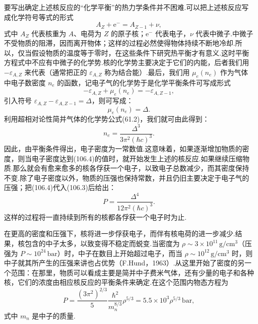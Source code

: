 要写出确定上述核反应的“化学平衡”的热力学条件并不困难.可以把上述核反应写成化学符号等式的形式
\begin{equation*}
  A_Z+\mathrm{e}^-=A_{Z-1}+\nu,
\end{equation*}
式中 $A_Z$ 代表核重为 $A$、电荷为 $Z$ 的原子核；$\mathrm{e}^-$ 代表电子，$\nu$ 代表中微子.中微子不受物质的阻滞，因而离开物体；这样的过程必然使得物体持续不断地冷却.所以，仅当假设物质的温度等于零时，在这些条件下研究热平衡才有意义.这时平衡方程式中不应有中微子的化学势.核的化学势主要决定于它们的内能，后者我们用 $-\varepsilon_{A,Z}$ 来代表（通常把正的 $\varepsilon_{A,Z}$ 称为结合能）.最后，我们用 $\mu_e(n_e)$ 作为气体中电子数密度 $n_e$ 的函数，记电子气的化学势于是化学平衡条件可写成形式
\begin{equation*}
  -\varepsilon_{A,Z}+\mu_e(n_e)=-\varepsilon_{A,Z-1},
\end{equation*}
引入符号 $\varepsilon_{A,Z}-\varepsilon_{A,Z-1}=\Delta$，则可写成：
\begin{equation*}
  \mu_e(n_e)=\Delta.
\end{equation*}
利用超相对论性简并气体的化学势公式(61.2)，我们就可由此得到：
\begin{equation}
  n_e=\frac{\Delta^3}{3\pi^2(\hbar c)^3}.
\end{equation}
因此，由平衡条件得出，电子密度为一常数值.这意味着，如果逐渐增加物质的密度，则当电子密度达到(106.4)的值时，就开始发生上述的核反应.如果继续压缩物质.那么就会有愈来愈多的核各俘获一个电子，以致电子总数减少，而其密度保持不变.除了电子密度以外，物质的压强也保持常数，并且仍旧主要决定于电子气的压强；把(106.4)代入(106.3)后给出：
\begin{equation}
  P=\frac{\Delta^4}{12\pi^2(\hbar c)^3}.
\end{equation}
这样的过程将一直持续到所有的核都各俘获一个电子时为止.

在更高的密度和压强下，核将进一步俘获电子，而伴有核电荷的进一步减少.结果，核包含的中子太多，以致变得不稳定而蜕变.当密度为 $\rho\sim3\times10^{11}\,\mathrm{g/cm^3}$（压强为 $P\sim10^{24}\,\mathrm{bar}$）时，中子在数目上开始超过电子，而当 $\rho\sim10^{12}\,\mathrm{g/cm^3}$ 时，则中子就其所产生的压强来讲也占优势（F.Hund，1963）.从这里开始了密度的另一个范围：在那里，物质可以看成主要是简并中子费米气体，还有少量的电子和各种核，它们的浓度由相应核反应的平衡条件来确定.在这个范围内物态方程为
\begin{equation}
  P=\frac{(3\pi^2)^{2/3}}{5}\frac{\hbar^2}{m_n^{8/3}}\rho^{5/3}
  =5.5\times10^3\rho^{5/3}\,\mathrm{bar},
\end{equation}
式中 $m_n$ 是中子的质量.

